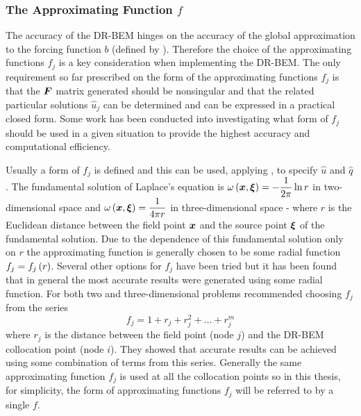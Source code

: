 \subsubsection{The Approximating Function $f$}
\label{sec:approxfnchoice}

The accuracy of the DR-BEM hinges on the accuracy of the global
approximation to the forcing function $b$ (defined by
).  Therefore the choice of the approximating
functions $f_{j}$ is a key consideration when implementing the DR-BEM. The
only requirement so far prescribed on the form of the approximating
functions $f_{j}$ is that the $\matr{F}$ matrix generated should be
nonsingular and that the related particular solutions $\hat{u}_{j}$ can be
determined and can be expressed in a practical closed form.  Some work has
been conducted into investigating what form of $f_{j}$ should be used in a
given situation to provide the highest accuracy and computational
efficiency.

Usually a form of $f_{j}$ is defined and this can be used, applying
, to specify $\hat{u}$ and $\hat{q}$.  The fundamental
solution of Laplace's equation is $\fnof{\omega}{\vect{x},\vect{\xi}} =
-\dfrac{1}{2\pi} \ln r$ in two-dimensional space and
$\fnof{\omega}{\vect{x},\vect{\xi}} = \dfrac{1}{4 \pi r}$ in three-dimensional
space - where $r$ is the Euclidean distance between the field point
$\vect{x}$ and the source point $\vect{\xi}$ of the fundamental
solution.  Due to the dependence of this fundamental solution only on $r$
the approximating function is generally chosen to be some radial function
\ie  $f_{j} =  f_{j}\left( r \right) $. Several other options for $f_{j}$ have been tried
\cite{partridge:1992} but it has been found that in general the most accurate
results were generated using some radial function.  For both two and
three-dimensional problems  recommended choosing
$f_{j}$ from the series
\begin{equation}
  f_{j} = 1 + r_{j} + r_{j}^{2} +\ldots+ r_{j}^{m}
\label{eq:fdefine}
\end{equation}
where $r_{j}$ is the distance between the field point (node $j$) and the
DR-BEM collocation point (node $i$).  They showed that accurate results can
be achieved using some combination of terms from this series.  Generally
the same approximating function $f_{j}$ is used at all the collocation
points so in this thesis, for simplicity, the form of approximating
functions $f_{j}$ will be referred to by a single $f$.

